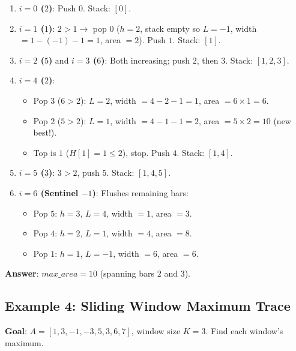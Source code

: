 \documentclass[11pt,a4paper]{article}
\theoremstyle{definition}
\begin{document}
\begin{enumerate}
    \item \textbf{$i = 0$ ($2$)}: Push $0$. Stack: $[0]$.
    \item \textbf{$i = 1$ ($1$)}: $2 > 1 \to$ pop $0$ ($h = 2$, stack empty so $L = -1$, width $= 1 - (-1) - 1 = 1$, area $= 2$). Push $1$. Stack: $[1]$.
    \item \textbf{$i = 2$ ($5$)} and \textbf{$i = 3$ ($6$)}: Both increasing; push $2$, then $3$. Stack: $[1, 2, 3]$.
    \item \textbf{$i = 4$ ($2$)}:
    \begin{itemize}
        \item Pop $3$ ($6 > 2$): $L = 2$, width $= 4 - 2 - 1 = 1$, area $= 6 \times 1 = 6$.
        \item Pop $2$ ($5 > 2$): $L = 1$, width $= 4 - 1 - 1 = 2$, area $= 5 \times 2 = 10$ (new best!).
        \item Top is $1$ ($H[1] = 1 \le 2$), stop. Push $4$. Stack: $[1, 4]$.
    \end{itemize}
    \item \textbf{$i = 5$ ($3$)}: $3 > 2$, push $5$. Stack: $[1, 4, 5]$.
    \item \textbf{$i = 6$ (Sentinel $-1$)}: Flushes remaining bars:
    \begin{itemize}
        \item Pop $5$: $h = 3$, $L = 4$, width $= 1$, area $= 3$.
        \item Pop $4$: $h = 2$, $L = 1$, width $= 4$, area $= 8$.
        \item Pop $1$: $h = 1$, $L = -1$, width $= 6$, area $= 6$.
    \end{itemize}
\end{enumerate}

\textbf{Answer}: $max\_area = 10$ (spanning bars $2$ and $3$).

\subsection{Example 4: Sliding Window Maximum Trace}

\textbf{Goal}: $A = [1, 3, -1, -3, 5, 3, 6, 7]$, window size $K = 3$. Find each window's maximum.
\end{document}
